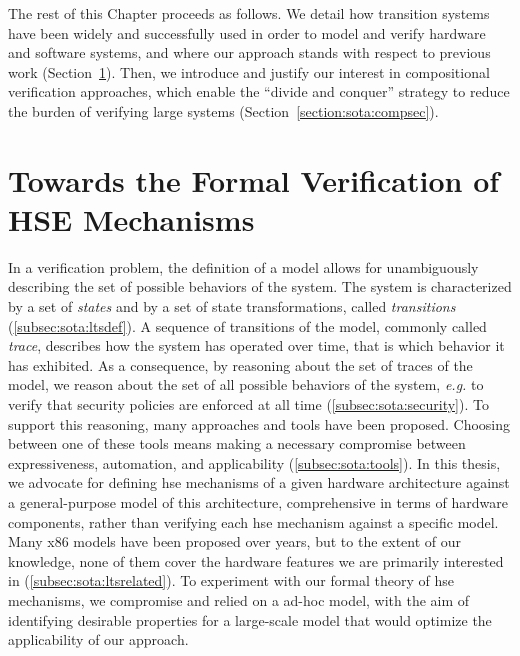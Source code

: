The rest of this Chapter proceeds as follows.
%
We detail how transition systems have been widely and successfully used in order
to model and verify hardware and software systems, and where our approach stands
with respect to previous work (Section~\ref{sec:sota:formalisms}).
%
Then, we introduce and justify our interest in compositional verification
approaches, which enable the ``divide and conquer'' strategy to reduce the
burden of verifying large systems (Section~\ref{section:sota:compsec}).

\section{Towards the Formal Verification of HSE Mechanisms}
\label{sec:sota:formalisms}

In a verification problem, the definition of a model allows for unambiguously
describing the set of possible behaviors of the system.
%
The system is characterized by a set of \emph{states} and by a set of state
transformations, called \emph{transitions} (\ref{subsec:sota:ltsdef}).
%
A sequence of transitions of the model, commonly called \emph{trace}, describes
how the system has operated over time, that is which behavior it has exhibited.
%
As a consequence, by reasoning about the set of traces of the model, we reason
about the set of all possible behaviors of the system, \emph{e.g.} to verify
that security policies are enforced at all time (\ref{subsec:sota:security}).
%
To support this reasoning, many approaches and tools have been
proposed. Choosing between one of these tools means making a necessary
compromise between expressiveness, automation, and applicability
(\ref{subsec:sota:tools}).
%
In this thesis, we advocate for defining \ac{hse} mechanisms of a given hardware
architecture against a general-purpose model of this architecture, comprehensive
in terms of hardware components, rather than verifying each \ac{hse} mechanism
against a specific model. 
%
Many x86 models have been proposed over years, but to the extent of our
knowledge, none of them cover the hardware features we are primarily interested
in (\ref{subsec:sota:ltsrelated}).
%
To experiment with our formal theory of \ac{hse} mechanisms, we compromise and
relied on a ad-hoc model, with the aim of identifying desirable properties for a
large-scale model that would optimize the applicability of our approach. 

